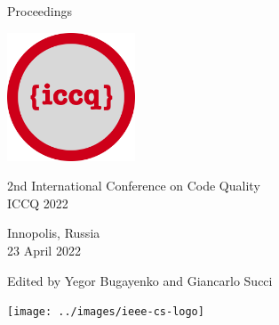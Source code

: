 
\thispagestyle{empty}
\begin{center}
Proceedings

\vspace{1in}

\includegraphics[height=1.5in]{../../logo}

\vspace{0.5in}

{\Large 2nd International Conference on Code Quality\\[12pt]
ICCQ 2022}

\vspace{0.5in}

Innopolis, Russia\\
23 April 2022

\vspace{0.5in}

Edited by Yegor Bugayenko and Giancarlo Succi

\vspace{1.5in}




\texttt{[image: ../images/ieee-cs-logo]}

\end{center}
